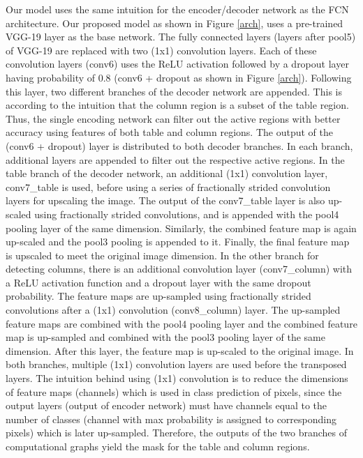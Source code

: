 \documentclass[conference]{IEEEtran}
\begin{document}
Our model uses the same intuition for the encoder/decoder network as the FCN architecture. Our proposed model as shown in Figure \ref{arch}, uses a pre-trained VGG-19 layer as the base network. The fully connected layers (layers after pool5) of VGG-19 are replaced with two (1x1) convolution layers. Each of these convolution layers (conv6) uses the ReLU activation followed by a dropout layer having probability of 0.8 (conv6 + dropout as shown in Figure \ref{arch}). Following this layer, two different branches of the decoder network are appended. This is according to the intuition that the column region is a subset of the table region. Thus, the single encoding network can filter out the active regions with better accuracy using features of both table and column regions. The output of the (conv6 + dropout) layer is distributed to both decoder branches. In each branch, additional layers are appended to filter out the respective active regions. In the table branch of the decoder network, an additional (1x1) convolution layer, conv7\_table is used, before using a series of fractionally strided convolution layers for upscaling the image. The output of the conv7\_table layer is also up-scaled using fractionally strided convolutions, and is appended with the pool4 pooling layer of the same dimension. Similarly, the combined feature map is again up-scaled and the pool3 pooling is appended to it. Finally, the final feature map is upscaled to meet the original image dimension. In the other branch for detecting columns, there is an additional convolution layer (conv7\_column) with a ReLU activation function and a dropout layer with the same dropout probability. The feature maps are up-sampled using fractionally strided convolutions after a (1x1) convolution (conv8\_column) layer. The up-sampled feature maps are combined with the pool4 pooling layer and the combined feature map is up-sampled and combined with the pool3 pooling layer of the same dimension. After this layer, the feature map is up-scaled to the original image. In both branches, multiple (1x1) convolution layers are used before the transposed layers. The intuition behind using (1x1) convolution is to reduce the dimensions of feature maps (channels) which is used in class prediction of pixels, since the output layers (output of encoder network) must have channels equal to the number of classes (channel with max probability is assigned to corresponding pixels) which is later up-sampled. Therefore, the outputs of the two branches of computational graphs yield the mask for the table and column regions. 
\end{document}
